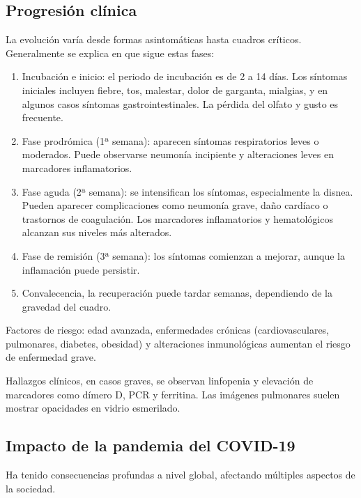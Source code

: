 \subsection{Progresión clínica}
La evolución varía desde formas asintomáticas hasta cuadros críticos. Generalmente se explica en \cite{cdc_covid19_yellowbook} que sigue estas fases:

\begin{enumerate}
    \item Incubación e inicio: el periodo de incubación es de 2 a 14 días. Los síntomas iniciales incluyen fiebre, tos, malestar, dolor de garganta, mialgias, y en algunos casos síntomas gastrointestinales. La pérdida del olfato y gusto es frecuente.
    \item Fase prodrómica (1ª semana): aparecen síntomas respiratorios leves o moderados. Puede observarse neumonía incipiente y alteraciones leves en marcadores inflamatorios.
    \item Fase aguda (2ª semana): se intensifican los síntomas, especialmente la disnea. Pueden aparecer complicaciones como neumonía grave, daño cardíaco o trastornos de coagulación. Los marcadores inflamatorios y hematológicos alcanzan sus niveles más alterados.
    \item Fase de remisión (3ª semana): los síntomas comienzan a mejorar, aunque la inflamación puede persistir.
    \item Convalecencia, la recuperación puede tardar semanas, dependiendo de la gravedad del cuadro.
\end{enumerate}

Factores de riesgo: edad avanzada, enfermedades crónicas (cardiovasculares, pulmonares, diabetes, obesidad) y alteraciones inmunológicas aumentan el riesgo de enfermedad grave.

Hallazgos clínicos, en casos graves, se observan linfopenia y elevación de marcadores como dímero D, PCR y ferritina. Las imágenes pulmonares suelen mostrar opacidades en vidrio esmerilado.

\subsection{Impacto de la pandemia del COVID-19}
Ha tenido consecuencias profundas a nivel global, afectando múltiples aspectos de la sociedad. 

